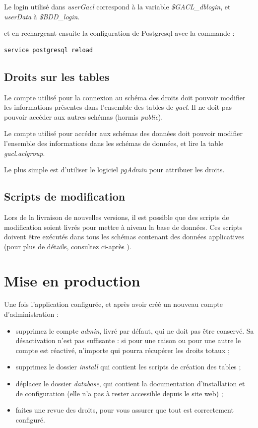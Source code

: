 Le login utilisé dans \textit{userGacl} correspond à la variable \textit{\$GACL\_dblogin}, et \textit{userData} à \textit{\$BDD\_login}.

et en rechargeant ensuite la configuration de Postgresql avec la commande :
\begin{lstlisting}
service postgresql reload
\end{lstlisting}

\subsection{Droits sur les tables}

Le compte utilisé pour la connexion au schéma des droits doit pouvoir modifier les informations présentes dans l'ensemble des tables de \textit{gacl}. Il ne doit pas pouvoir accéder aux autres schémas (hormis \textit{public}).

Le compte utilisé pour accéder aux schémas des données doit pouvoir modifier l'ensemble des informations dans les schémas de données, et lire la table \textit{gacl.aclgroup}.

Le plus simple est d'utiliser le logiciel \textit{pgAdmin} \cite{pgadmin} pour attribuer les droits.

\subsection{Scripts de modification}

Lors de la livraison de nouvelles versions, il est possible que des scripts de modification soient livrés pour mettre à niveau la base de données. Ces scripts doivent être exécutés dans tous les schémas contenant des données applicatives (pour plus de détails, consultez ci-après \textit{}).

\section{Mise en production}

Une fois l'application configurée, et après avoir créé un nouveau compte d'administration :
\begin{itemize}
\item supprimez le compte \textit{admin}, livré par défaut, qui ne doit pas être conservé. Sa désactivation n'est pas suffisante : si pour une raison ou pour une autre le compte est réactivé, n'importe qui pourra récupérer les droits totaux ;
\item supprimez le dossier \textit{install} qui contient les scripts de création des tables ;
\item déplacez le dossier \textit{database}, qui contient la documentation d'installation et de configuration (elle n'a pas à rester accessible depuis le site web) ;
\item faites une revue des droits, pour vous assurer que tout est correctement configuré.
\end{itemize}

